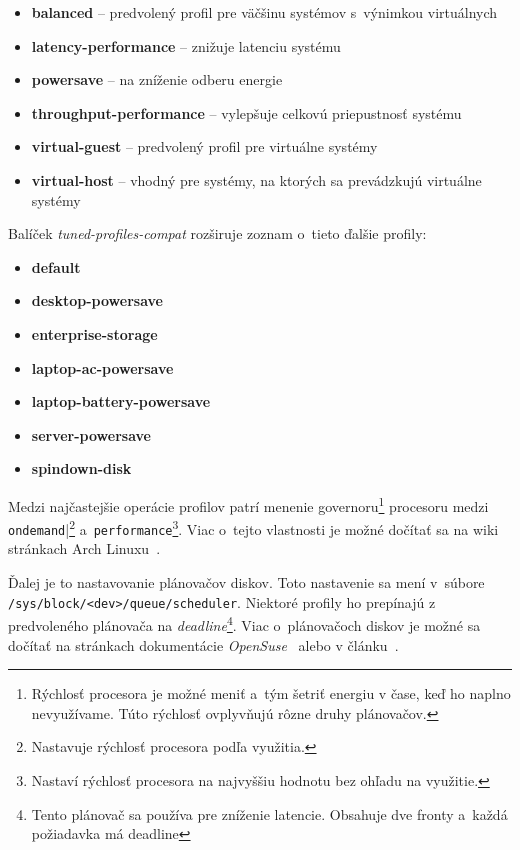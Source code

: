 \begin{itemize}
    \item \textbf{balanced} -- predvolený profil pre väčšinu systémov s~výnimkou virtuálnych
    \item \textbf{latency-performance} -- znižuje latenciu systému
    \item \textbf{powersave} -- na zníženie odberu energie
    \item \textbf{throughput-performance} -- vylepšuje celkovú priepustnosť systému 
    \item \textbf{virtual-guest} -- predvolený profil pre virtuálne systémy
    \item \textbf{virtual-host} -- vhodný pre systémy, na ktorých sa prevádzkujú virtuálne systémy
\end{itemize}

Balíček \emph{tuned-profiles-compat} rozširuje zoznam o~tieto ďalšie profily:

\begin{itemize}
    \item \textbf{default}
    \item \textbf{desktop-powersave}
    \item \textbf{enterprise-storage}
    \item \textbf{laptop-ac-powersave}
    \item \textbf{laptop-battery-powersave}
    \item \textbf{server-powersave}
    \item \textbf{spindown-disk}
\end{itemize}

Medzi najčastejšie operácie profilov patrí menenie governoru\footnote{Rýchlosť
procesora je možné meniť a~tým šetriť energiu v čase, keď ho naplno
nevyužívame. Túto rýchlosť ovplyvňujú rôzne druhy plánovačov.} procesoru medzi
\texttt{ondemand}|\footnote{Nastavuje rýchlosť procesora podľa využitia.}
a~\texttt{performance}\footnote{Nastaví rýchlosť procesora na najvyššiu hodnotu
bez ohľadu na využitie.}. Viac o~tejto vlastnosti je možné dočítať sa na wiki
stránkach Arch Linuxu~\cite{arch:governor}.

Ďalej je to nastavovanie plánovačov diskov. Toto nastavenie sa mení v~súbore
\texttt{/sys\-/block\-/<dev>\-/queue\-/scheduler}. Niektoré profily ho prepínajú z
predvoleného plánovača na \emph{deadline}\footnote{Tento plánovač sa používa
pre zníženie latencie. Obsahuje dve fronty a~každá požiadavka má deadline}.
Viac o~plánovačoch diskov je možné sa dočítať na stránkach dokumentácie
\emph{OpenSuse}~\cite{suse:scheduler} alebo v článku~\cite{book:scheduler}.

